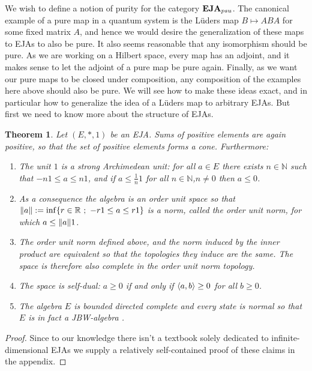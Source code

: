 \documentclass[submission,copyright,creativecommons]{eptcs}
\newcounter{main}
\newtheorem{theorem}[main]{Theorem}
\theoremstyle{definition}
\DeclarePairedDelimiter{\inn}{\langle}{\rangle}
\newcommand{\EJA}{\text{\textbf{EJA}}\xspace}
\newcommand\R{\mathbb{R}}
\newcommand\N{\mathbb{N}}
\begin{document}
We wish to define a notion of purity for the category $\EJA_{psu}$.
The canonical example of a pure map in a quantum system is the L\"uders map $B\mapsto ABA$ for some fixed matrix $A$,
and hence we would desire the generalization of these maps to EJAs to also be pure.
It also seems reasonable that any isomorphism should be pure. 
As we are working on a Hilbert space, every map has an adjoint, and it makes sense to let the adjoint of a pure map be pure again.
Finally, as we want our pure maps to be closed under composition, any composition of the examples here above should also be pure.
We will see how to make these ideas exact, and in particular how
to generalize the idea of a L\"uders map to
arbitrary EJAs. But first we need to know more about the structure
of EJAs.


\begin{theorem}\label{theor:chu}
	Let $(E,*,1)$ be an EJA. Sums of positive elements are again positive, so that the set of positive elements forms a \emph{cone}. Furthermore:
	\begin{enumerate}
		\item The unit $1$ is a \emph{strong Archimedean unit}: for all $a\in E$ there exists $n\in \N$ such that $-n1\leq a\leq n1$, and if $a\leq \frac{1}{n} 1$ for all $n\in \N$,$n\neq 0$ then $a\leq 0$.
		\item As a consequence the algebra is an \emph{order unit space}
            so that $\norm{a}:=\inf\{r\in \R~;~ -r1\leq a\leq r1\}$
            is a norm, called the \emph{order unit norm}, for which $a\leq \norm{a}1$.
		\item The order unit norm defined above, and the norm induced by the inner product are equivalent so that the topologies they induce are the same. The space is therefore also complete in the order unit norm topology.
		\item The space is \emph{self-dual}: $a\geq 0$ if and only if $\inn{a,b}\geq 0$ for all $b\geq 0$.
        \item The algebra $E$ is bounded directed complete and every state is normal so that $E$ is in fact a \emph{JBW-algebra} \cite{hanche1984jordan}.
	\end{enumerate}
\end{theorem}
\begin{proof}
    Since to our knowledge there isn't a textbook solely dedicated to infinite-dimensional EJAs we supply a relatively self-contained proof of these claims in the appendix.
\end{proof}
\end{document}
